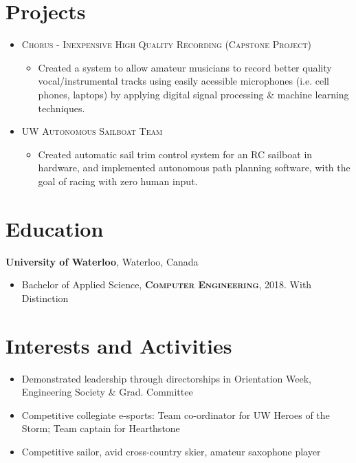 \documentclass[a4paper,10pt]{article}
\begin{document}
\section{Projects}
\begin{itemize}
	\item {\textsc{Chorus - Inexpensive High Quality Recording (Capstone Project)}}
	\begin{itemize}
		\item {\footnotesize{Created a system to allow amateur musicians to record better quality vocal/instrumental tracks using easily acessible microphones (i.e. cell phones, laptops) by applying digital signal processing \& machine learning techniques.}}
	\end{itemize}

	\item {\textsc{UW Autonomous Sailboat Team}}
	\begin{itemize}
		\item {\footnotesize{Created automatic sail trim control system for an RC sailboat in hardware, and implemented autonomous path planning software, with the goal of racing with zero human input.}}
	\end{itemize}
\end{itemize}

\section{Education}
\textbf{University of Waterloo}, Waterloo, Canada
\begin{itemize}
    \item{Bachelor of Applied Science, \textsc{\textbf{Computer Engineering}}, 2018. With Distinction}
\end{itemize}

\section{Interests and Activities}
\begin{itemize}
	\item {Demonstrated leadership through directorships in Orientation Week, Engineering Society \& Grad. Committee}
	\item {Competitive collegiate e-sports: Team co-ordinator for UW Heroes of the Storm; Team captain for Hearthstone}
	\item {Competitive sailor, avid cross-country skier, amateur saxophone player}
\end{itemize}
\end{document}
